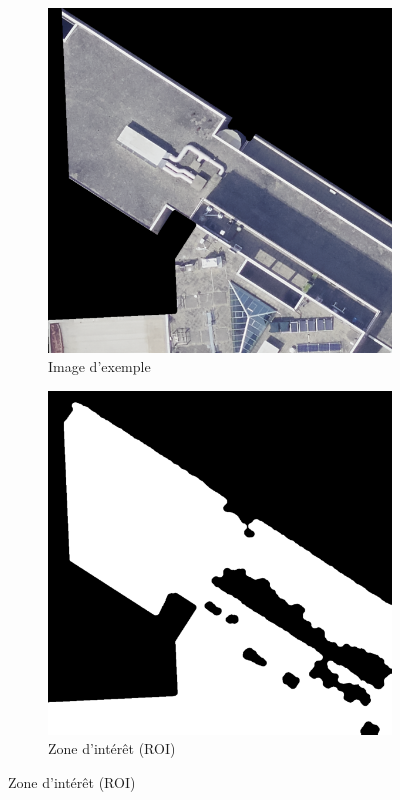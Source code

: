 \begin{figure}[H]
    \centering
    
    \begin{subfigure}[b]{0.48\textwidth}
        \centering
        \includegraphics[width=\textwidth]{02-main/figures/ch3_essai_sam_01_image_original.png}
        \caption{Image d'exemple}
        \label{fig:ch3_essai_sam_01_image_original}
    \end{subfigure}
    \hfill
    \begin{subfigure}[b]{0.48\textwidth}
        \centering
        \includegraphics[width=\textwidth]{02-main/figures/ch3_essai_sam_02_ROI.png}
        \caption{Zone d’intérêt (ROI)}
        \label{fig:ch3_essai_sam_02_ROI}
    \end{subfigure}
    

\end{figure}
